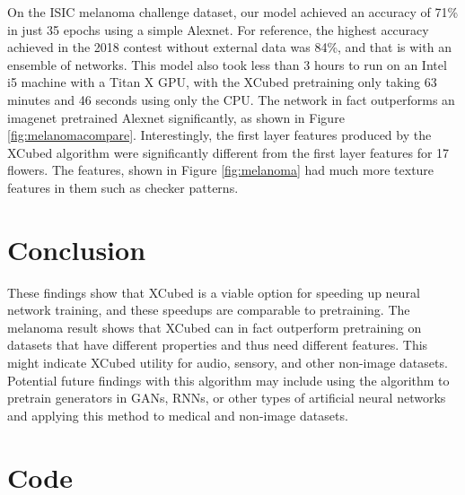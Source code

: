 \documentclass[twocolumn]{article}
\begin{document}
On the ISIC melanoma challenge dataset\cite{melanoma1}\cite{melanoma2}, our model achieved an accuracy of 71\% in just 35 epochs using a simple Alexnet. For reference, the highest accuracy achieved in the 2018 contest without external data was 84\%, and that is with an ensemble of networks. This model also took less than 3 hours to run on an Intel i5 machine with a Titan X GPU, with the XCubed pretraining only taking 63 minutes and 46 seconds using only the CPU. The network in fact outperforms an imagenet pretrained Alexnet significantly, as shown in Figure \ref{fig:melanomacompare}. Interestingly, the first layer features produced by the XCubed algorithm were significantly different from the first layer features for 17 flowers. The features, shown in Figure \ref{fig:melanoma} had much more texture features in them such as checker patterns.
\section{Conclusion}
These findings show that XCubed is a viable option for speeding up neural network training, and these speedups are comparable to pretraining. The melanoma result shows that XCubed can in fact outperform pretraining on datasets that have different properties and thus need different features. This might indicate XCubed utility for audio, sensory, and other non-image datasets. Potential future findings with this algorithm may include using the algorithm to pretrain generators in GANs, RNNs, or other types of artificial neural networks and applying this method to medical and non-image datasets.
\section{Code}

\nocite{*}


\end{document}
